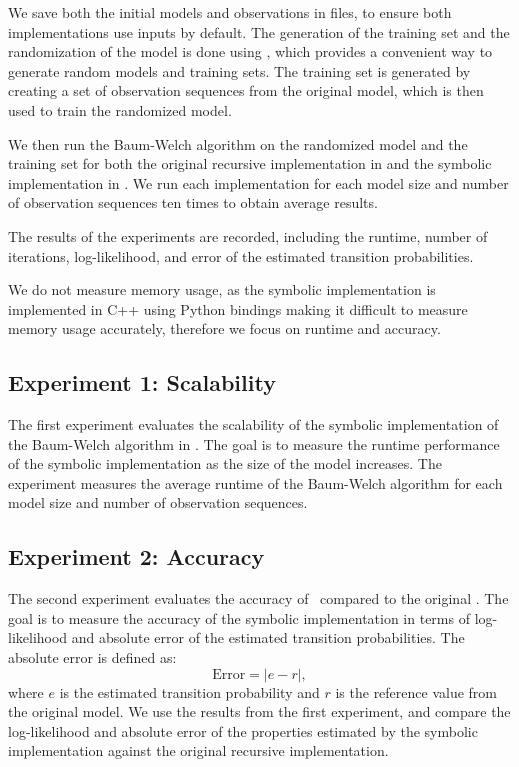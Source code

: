 We save both the initial models and observations in files, to ensure both implementations use inputs by default.
The generation of the training set and the randomization of the model is done using \Jajapy, which provides a convenient way to generate random models and training sets.
The training set is generated by creating a set of observation sequences from the original model, which is then used to train the randomized model.

We then run the Baum-Welch algorithm on the randomized model and the training set for both the original recursive implementation in \Jajapy and the symbolic implementation in \JajapyTwo.
We run each implementation for each model size and number of observation sequences ten times to obtain average results.

The results of the experiments are recorded, including the runtime, number of iterations, log-likelihood, and error of the estimated transition probabilities.

We do not measure memory usage, as the symbolic implementation is implemented in C++ using Python bindings making it difficult to measure memory usage accurately, therefore we focus on runtime and accuracy.

\subsection{Experiment 1: Scalability}\label{sec:exp_scalability}
The first experiment evaluates the scalability of the symbolic implementation of the Baum-Welch algorithm in \JajapyTwo.
The goal is to measure the runtime performance of the symbolic implementation as the size of the model increases.
The experiment measures the average runtime of the Baum-Welch algorithm for each model size and number of observation sequences.

\subsection{Experiment 2: Accuracy}\label{sec:exp_accuracy}
The second experiment evaluates the accuracy of \JajapyTwo\ compared to the original \Jajapy.
The goal is to measure the accuracy of the symbolic implementation in terms of log-likelihood and absolute error of the estimated transition probabilities.
The absolute error is defined as:
\[
    \text{Error} = |e - r|,
\]
where $e$ is the estimated transition probability and $r$ is the reference value from the original model.
We use the results from the first experiment, and compare the log-likelihood and absolute error of the properties estimated by the symbolic implementation against the original recursive implementation.

